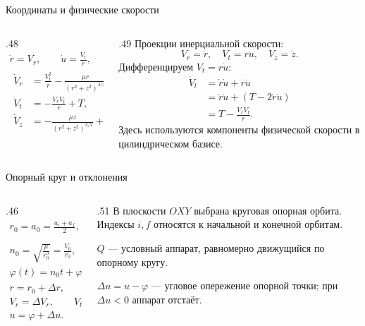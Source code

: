 \documentclass[11pt,aspectratio=169,t]{beamer}
\newcommand{\eqcompact}{\fontsize{10}{12}\selectfont}
\begin{document}
\begin{frame}{Координаты и физические скорости}
\relax
\begin{columns}[T,onlytextwidth]
\begin{column}{.48\textwidth}
{\eqcompact\derivationmathspacing
\[
\boxed{\begin{gathered}
 \dot r=V_r,\qquad \dot u=\frac{V_t}{r},\qquad \dot z=V_z,\\[20pt]
 \begin{aligned}
 \dot V_r&=\frac{V_t^2}{r}-\frac{\mu r}{(r^2+z^2)^{3/2}}+S,\\[6pt]
 \dot V_t&=-\frac{V_rV_t}{r}+T,\\[6pt]
 \dot V_z&=-\frac{\mu z}{(r^2+z^2)^{3/2}}+W.
 \end{aligned}
\end{gathered}}
\]
}
\end{column}
\begin{column}{.49\textwidth}
\RaggedRight
Проекции инерциальной скорости:
\[
 V_r=\dot r,\quad V_t=r\dot u,\quad V_z=\dot z.
\]
Дифференцируем $V_t=r\dot u$:
{\eqcompact\derivationmathspacing
\[
\begin{aligned}
 \dot V_t&=\dot r\dot u+r\ddot u\\[3pt]
 &=\dot r\dot u+(T-2\dot r\dot u)\\[3pt]
 &=T-\frac{V_rV_t}{r}.
\end{aligned}
\]
}
Здесь используются компоненты физической скорости в цилиндрическом базисе.
\end{column}
\end{columns}
\end{frame}

\begin{frame}{Опорный круг и отклонения}
\relax
\begin{columns}[T,onlytextwidth]
\begin{column}{.46\textwidth}
{\eqcompact\derivationmathspacing
\[
\begin{gathered}
 r_0=a_0=\frac{a_i+a_f}{2},\qquad V_0=\sqrt{\frac{\mu}{r_0}},\\[5pt]
 n_0=\sqrt{\frac{\mu}{r_0^3}}=\frac{V_0}{r_0},\\[5pt]
 \varphi(t)=n_0t+\varphi_0,\\[11pt]
 r=r_0+\Delta r,\\[5pt]
 V_r=\Delta V_r,\qquad V_t=V_0+\Delta V_t,\\[5pt]
 u=\varphi+\Delta u.
\end{gathered}
\]
}
\end{column}
\begin{column}{.51\textwidth}
\RaggedRight
В плоскости $OXY$ выбрана круговая опорная орбита. Индексы $i,f$ относятся к начальной и конечной орбитам.\par\medskip
$Q$ — условный аппарат, равномерно движущийся по опорному кругу.\par\medskip
$\Delta u=u-\varphi$ — угловое опережение опорной точки; при $\Delta u<0$ аппарат отстаёт.
\end{column}
\end{columns}
\end{frame}
\end{document}
